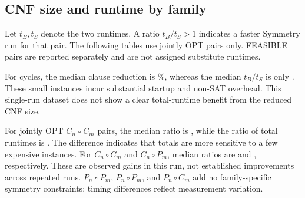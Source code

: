 \subsection{CNF size and runtime by family}
Let $t_B,t_S$ denote the two runtimes. A ratio $t_B/t_S>1$ indicates a faster
Symmetry run for that pair. The following tables use jointly OPT pairs only.
FEASIBLE pairs are reported separately and are not assigned substitute runtimes.
\begin{table}[H]
\caption{Runtime comparison on jointly OPT pairs.}
\centering\small
{}
\end{table}
\begin{table}[H]
\caption{Variable and clause reductions.}
\centering\small\setlength{\tabcolsep}{4pt}
\end{table}
For cycles, the median clause reduction is \CycleClauseMedian\%, whereas
the median $t_B/t_S$ is only \CycleTimeRatio. These small instances incur
substantial startup and non-SAT overhead. This single-run dataset does not
show a clear total-runtime benefit from the reduced CNF size.

For jointly OPT $C_n\mathbin{\square}C_m$ pairs, the median ratio is
\CxCTimeRatio, while the ratio of total runtimes is \CxCTotalTimeRatio.
The difference indicates that totals are more sensitive to a few expensive
instances. For $C_n\circ C_m$ and $C_n\circ P_m$, median ratios are
\CoCTimeRatio{} and \CoPTimeRatio, respectively. These are observed gains
in this run, not established improvements across repeated runs.
$P_n\mathbin{\square}P_m$, $P_n\circ P_m$, and $P_n\circ C_m$ add no
family-specific symmetry constraints; timing differences reflect measurement variation.

